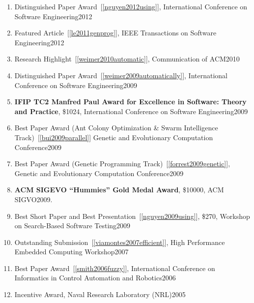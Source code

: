 \documentclass[11pt]{article}
\begin{document}
\begin{enumerate}
\item Distinguished Paper Award~[\ref{nguyen2012using}], International Conference on Software Engineering\hfill 2012

\item Featured Article~[\ref{le2011genprog}], IEEE Transactions on Software Engineering\hfill 2012

\item Research Highlight~[\ref{weimer2010automatic}], Communication of ACM\hfill 2010

\item Distinguished Paper Award~[\ref{weimer2009automatically}], International Conference on Software Engineering\hfill 2009 

\item \textbf{IFIP TC2 Manfred Paul Award for Excellence in Software: Theory and Practice}, \$1024, International Conference on Software Engineering\hfill 2009

\item Best Paper Award (Ant Colony Optimization \& Swarm Intelligence Track)~[\ref{bui2009parallel}] Genetic and Evolutionary Computation Conference\hfill 2009
\item Best Paper Award (Genetic Programming Track)~[\ref{forrest2009genetic}], Genetic and Evolutionary Computation Conference\hfill 2009
\item \textbf{ACM SIGEVO “Hummies” Gold Medal Award}, \$10000, ACM SIGVO\hfill 2009.
\item Best Short Paper and Best Presentation~[\ref{nguyen2009using}], \$270, Workshop on Search-Based Software Testing\hfill 2009
\item Outstanding Submission~[\ref{viamontes2007efficient}], High Performance Embedded Computing Workshop\hfill 2007
\item  Best Paper Award~[\ref{smith2006fuzzy}],  International Conference on Informatics in Control Automation and Robotics\hfill 2006
\item Incentive Award,  Naval Research Laboratory (NRL)\hfill 2005
\end{enumerate}
\end{document}
